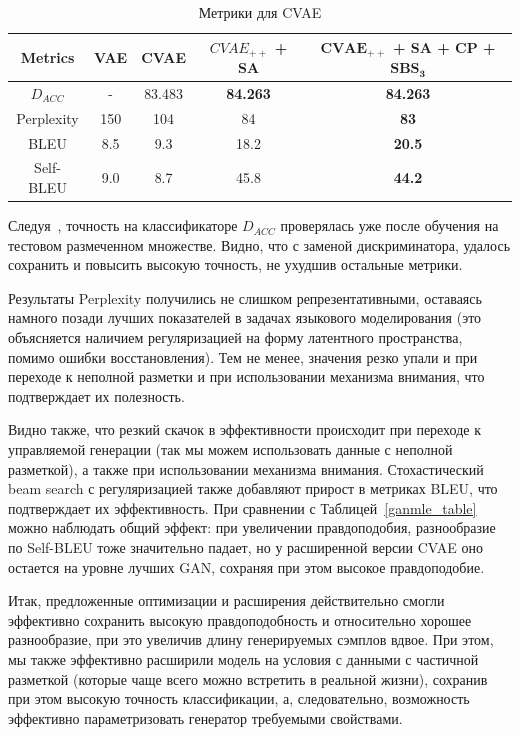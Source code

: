 \documentclass{spbau-diploma}
\begin{document}
\begin{table}[H]
\begin{tabular}{c | c c c c}
\toprule
Metrics & VAE & CVAE & $CVAE_{++}$ + SA & \textbf{$\boldsymbol{CVAE_{++}}$ + SA + CP + $\boldsymbol{SBS_3}$} \\
\midrule
$D_{ACC}$ & - & 83.483 & \textbf{84.263} & \textbf{84.263} \\
Perplexity & 150 & 104 & 84 & \textbf{83} \\
BLEU & 8.5 & 9.3 & 18.2 & \textbf{20.5} \\
Self-BLEU & 9.0 & 8.7 & 45.8 & \textbf{44.2} \\
\bottomrule
\end{tabular}
\caption{Метрики для CVAE}
\label{cvae_table}
\end{table}

Следуя~\cite{text_cvae}, точность на классификаторе $D_{ACC}$ проверялась уже 
после обучения на тестовом размеченном множестве. Видно, что с заменой 
дискриминатора, удалось сохранить и повысить высокую точность, не ухудшив 
остальные метрики.

Результаты Perplexity получились не слишком репрезентативными, оставаясь намного
позади лучших показателей в задачах языкового моделирования (это объясняется 
наличием регуляризацией на форму латентного пространства, помимо ошибки 
восстановления). Тем не менее, значения резко упали и при переходе к неполной
разметки и при использовании механизма внимания, что подтверждает их полезность.

Видно также, что резкий скачок в эффективности происходит при переходе к 
управляемой генерации (так мы можем использовать данные с неполной разметкой), а 
также при использовании механизма внимания. 
Стохастический beam search с регуляризацией
также добавляют прирост в метриках BLEU, что подтверждает их эффективность. При 
сравнении с Таблицей~\ref{ganmle_table} можно наблюдать общий эффект: при 
увеличении правдоподобия, разнообразие по Self-BLEU тоже значительно падает, 
но у расширенной версии CVAE оно остается на уровне лучших GAN, 
сохраняя при этом высокое правдоподобие.

Итак, предложенные оптимизации и расширения действительно смогли эффективно 
сохранить высокую правдоподобность и относительно хорошее разнообразие, при 
это увеличив длину генерируемых сэмплов вдвое. При этом, мы также эффективно 
расширили модель на условия с данными с частичной разметкой (которые чаще 
всего можно встретить в реальной жизни), сохранив при этом высокую точность 
классификации, а, следовательно, возможность эффективно параметризовать 
генератор требуемыми свойствами.
\end{document}

